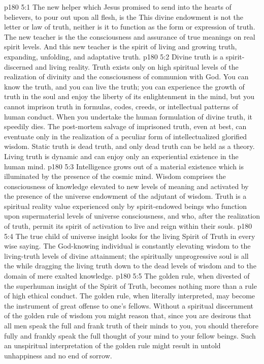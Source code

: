 \vs p180 5:1 The new helper which Jesus promised to send into the hearts of believers, to pour out upon all flesh, is the  This divine endowment is not the letter or law of truth, neither is it to function as the form or expression of truth. The new teacher is the  the consciousness and assurance of true meanings on real spirit levels. And this new teacher is the spirit of living and growing truth, expanding, unfolding, and adaptative truth.
\vs p180 5:2 Divine truth is a spirit\hyp{}discerned and living reality. Truth exists only on high spiritual levels of the realization of divinity and the consciousness of communion with God. You can know the truth, and you can live the truth; you can experience the growth of truth in the soul and enjoy the liberty of its enlightenment in the mind, but you cannot imprison truth in formulas, codes, creeds, or intellectual patterns of human conduct. When you undertake the human formulation of divine truth, it speedily dies. The post\hyp{}mortem salvage of imprisoned truth, even at best, can eventuate only in the realization of a peculiar form of intellectualized glorified wisdom. Static truth is dead truth, and only dead truth can be held as a theory. Living truth is dynamic and can enjoy only an experiential existence in the human mind.
\vs p180 5:3 Intelligence grows out of a material existence which is illuminated by the presence of the cosmic mind. Wisdom comprises the consciousness of knowledge elevated to new levels of meaning and activated by the presence of the universe endowment of the adjutant of wisdom. Truth is a spiritual reality value experienced only by spirit\hyp{}endowed beings who function upon supermaterial levels of universe consciousness, and who, after the realization of truth, permit its spirit of activation to live and reign within their souls.
\vs p180 5:4 The true child of universe insight looks for the living Spirit of Truth in every wise saying. The God\hyp{}knowing individual is constantly elevating wisdom to the living\hyp{}truth levels of divine attainment; the spiritually unprogressive soul is all the while dragging the living truth down to the dead levels of wisdom and to the domain of mere exalted knowledge.
\vs p180 5:5 The golden rule, when divested of the superhuman insight of the Spirit of Truth, becomes nothing more than a rule of high ethical conduct. The golden rule, when literally interpreted, may become the instrument of great offense to one’s fellows. Without a spiritual discernment of the golden rule of wisdom you might reason that, since you are desirous that all men speak the full and frank truth of their minds to you, you should therefore fully and frankly speak the full thought of your mind to your fellow beings. Such an unspiritual interpretation of the golden rule might result in untold unhappiness and no end of sorrow.
